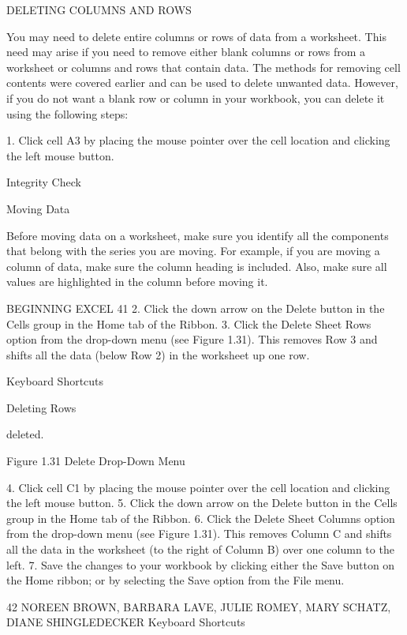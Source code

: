 DELETING COLUMNS AND ROWS

You may need to delete entire columns or rows of data from a worksheet. This need may arise if
you need to remove either blank columns or rows from a worksheet or columns and rows that
contain data. The methods for removing cell contents were covered earlier and can be used to delete
unwanted data. However, if you do not want a blank row or column in your workbook, you can delete
it using the following steps:

1. Click cell A3 by placing the mouse pointer over the cell location and clicking the left mouse
button.




Integrity Check

Moving Data

Before moving data on a worksheet, make sure you identify all the components that belong with the series you are
moving. For example, if you are moving a column of data, make sure the column heading is included. Also, make sure
all values are highlighted in the column before moving it.




BEGINNING EXCEL 41
2. Click the down arrow on the Delete button in the Cells group in the Home tab of the Ribbon.
3. Click the Delete Sheet Rows option from the drop-down menu (see Figure 1.31). This removes
Row 3 and shifts all the data (below Row 2) in the worksheet up one row.


Keyboard Shortcuts


Deleting Rows

deleted.




Figure 1.31 Delete Drop-Down Menu




4. Click cell C1 by placing the mouse pointer over the cell location and clicking the left mouse
button.
5. Click the down arrow on the Delete button in the Cells group in the Home tab of the Ribbon.
6. Click the Delete Sheet Columns option from the drop-down menu (see Figure 1.31). This
removes Column C and shifts all the data in the worksheet (to the right of Column B) over one
column to the left.
7. Save the changes to your workbook by clicking either the Save button on the Home ribbon; or
by selecting the Save option from the File menu.




42 NOREEN BROWN, BARBARA LAVE, JULIE ROMEY, MARY SCHATZ, DIANE SHINGLEDECKER
Keyboard Shortcuts


